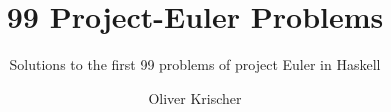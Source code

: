 \documentclass{scrreprt}
\numberwithin{equation}{chapter}
\begin{document}
\title{99 Project-Euler Problems}
\author{Oliver Krischer}
\subtitle{Solutions to the first 99 problems of project Euler in Haskell}
\maketitle
\begin{abstract}
\end{abstract}
\tableofcontents








\end{document}
